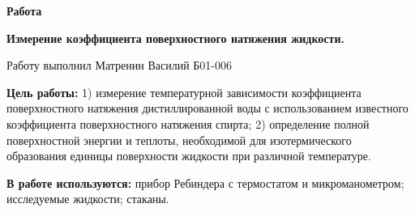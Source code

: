 

\shiftedText{0.5cm}{14cm}
{

    \begin{center}
    \vspace*{1.0cm}    
        
        {\bf\huge Работа \labnum }
        
    \vspace*{0.2cm}    
        
        {\bf\Large Измерение коэффициента поверхностного натяжения жидкости. }
        
    \vspace*{0.8cm}
        
        {\Large Работу выполнил Матренин Василий Б01-006 }
        
    \vspace*{1.6cm}
    
    \end{center}
    
    {\bf\noindent Цель работы: }  1) измерение температурной зависимости  коэффициента поверхностного натяжения дистиллированной воды с использованием известного коэффициента поверхностного натяжения спирта;  2) определение полной поверхностной энергии  и теплоты, необходимой для изотермического образования единицы  поверхности жидкости  при различной температуре. 

    
    \vspace*{0.6cm}
    
    {\bf\noindent В работе используются: } прибор  Ребиндера  с термостатом и микроманометром; исследуемые жидкости; стаканы.

}

\newpage